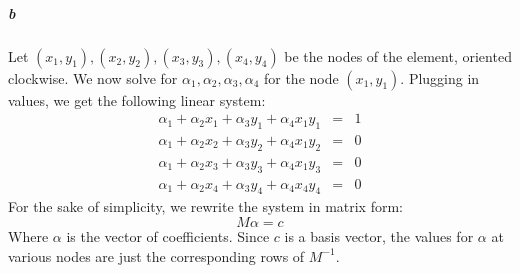\documentclass{article}
\begin{document}
\subparagraph{b}

Let $(x_1, y_1), (x_2, y_2), (x_3, y_3), (x_4, y_4)$ be the nodes of the element, oriented clockwise.  We now solve for $\alpha_1, \alpha_2, \alpha_3, \alpha_4$ for the node $(x_1, y_1)$.  Plugging in values, we get the following linear system:
\begin{eqnarray*}
\alpha_1 + \alpha_2 x_1 + \alpha_3 y_1 + \alpha_4 x_1 y_1 & = & 1 \\
\alpha_1 + \alpha_2 x_2 + \alpha_3 y_2 + \alpha_4 x_1 y_2 & = & 0 \\
\alpha_1 + \alpha_2 x_3 + \alpha_3 y_3 + \alpha_4 x_1 y_3 & = & 0 \\
\alpha_1 + \alpha_2 x_4 + \alpha_3 y_4 + \alpha_4 x_4 y_4 & = & 0
\end{eqnarray*}
For the sake of simplicity, we rewrite the system in matrix form:
\[ M \alpha = c \]
Where $\alpha$ is the vector of coefficients. Since $c$ is a basis vector, the values for $\alpha$ at various nodes are just the corresponding rows of $M^{-1}$.  
\end{document}
